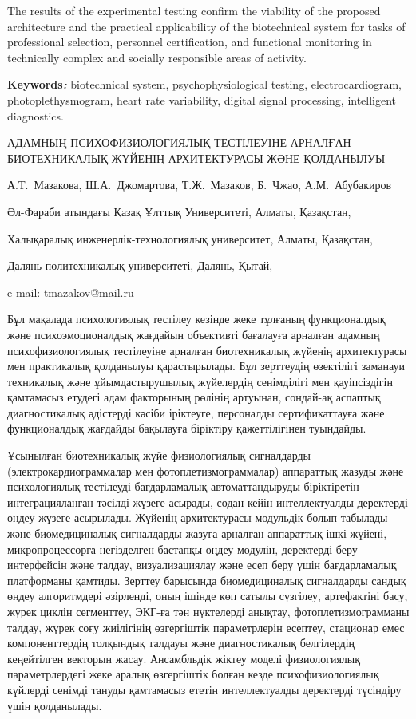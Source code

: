The results of the experimental testing confirm the viability of the
proposed architecture and the practical applicability of the
biotechnical system for tasks of professional selection, personnel
certification, and functional monitoring in technically complex and
socially responsible areas of activity.

{\bfseries Keywords\emph{: }}biotechnical system, psychophysiological
testing, electrocardiogram, photoplethysmogram, heart rate variability,
digital signal processing, intelligent diagnostics.

\begin{header}
АДАМНЫҢ ПСИХОФИЗИОЛОГИЯЛЫҚ ТЕСТІЛЕУІНЕ АРНАЛҒАН БИОТЕХНИКАЛЫҚ ЖҮЙЕНІҢ АРХИТЕКТУРАСЫ ЖӘНЕ ҚОЛДАНЫЛУЫ

А.Т.~Мазакова,
Ш.А.~Джомартова,
Т.Ж.~Мазаков\envelope,
Б.~Чжао,
А.М.~Абубакиров
\end{header}

\begin{affil}
Әл-Фараби атындағы Қазақ Ұлттық Университеті, Алматы, Қазақстан,

Халықаралық инженерлік-технологиялық университет, Алматы, Қазақстан,

Далянь политехникалық университеті, Далянь, Қытай,

e-mail: tmazakov@mail.ru
\end{affil}

Бұл мақалада психологиялық тестілеу кезінде жеке тұлғаның функционалдық
және психоэмоционалдық жағдайын объективті бағалауға арналған адамның
психофизиологиялық тестілеуіне арналған биотехникалық жүйенің
архитектурасы мен практикалық қолданылуы қарастырылады. Бұл зерттеудің
өзектілігі заманауи техникалық және ұйымдастырушылық жүйелердің
сенімділігі мен қауіпсіздігін қамтамасыз етудегі адам факторының рөлінің
артуынан, сондай-ақ аспаптық диагностикалық әдістерді кәсіби іріктеуге,
персоналды сертификаттауға және функционалдық жағдайды бақылауға
біріктіру қажеттілігінен туындайды.

Ұсынылған биотехникалық жүйе физиологиялық сигналдарды
(электрокардиограммалар мен фотоплетизмограммалар) аппараттық жазуды
және психологиялық тестілеуді бағдарламалық автоматтандыруды
біріктіретін интеграцияланған тәсілді жүзеге асырады, содан кейін
интеллектуалды деректерді өңдеу жүзеге асырылады. Жүйенің архитектурасы
модульдік болып табылады және биомедициналық сигналдарды жазуға арналған
аппараттық ішкі жүйені, микропроцессорға негізделген бастапқы өңдеу
модулін, деректерді беру интерфейсін және талдау, визуализациялау және
есеп беру үшін бағдарламалық платформаны қамтиды. Зерттеу барысында
биомедициналық сигналдарды сандық өңдеу алгоритмдері әзірленді, оның
ішінде көп сатылы сүзгілеу, артефактіні басу, жүрек циклін сегменттеу,
ЭКГ-ға тән нүктелерді анықтау, фотоплетизмограмманы талдау, жүрек соғу
жиілігінің өзгергіштік параметрлерін есептеу, стационар емес
компоненттердің толқындық талдауы және диагностикалық белгілердің
кеңейтілген векторын жасау. Ансамбльдік жіктеу моделі физиологиялық
параметрлердегі жеке аралық өзгергіштік болған кезде психофизиологиялық
күйлерді сенімді тануды қамтамасыз ететін интеллектуалды деректерді
түсіндіру үшін қолданылады.

